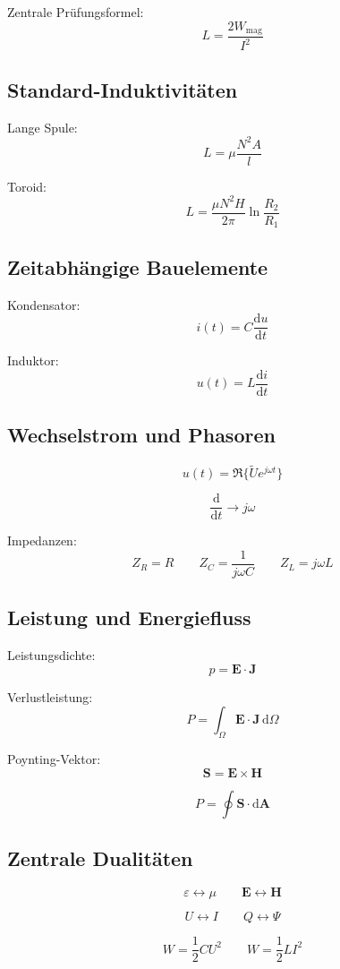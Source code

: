 \documentclass[a4paper]{article}
\begin{document}
Zentrale Prüfungsformel:
\[
\boxed{
L = \frac{2W_\mathrm{mag}}{I^2}
}
\]

\subsection{Standard-Induktivitäten}

Lange Spule:
\[
L = \mu \frac{N^2 A}{l}
\]

Toroid:
\[
L = \frac{\mu N^2 H}{2\pi}
\ln\frac{R_2}{R_1}
\]

\subsection{Zeitabhängige Bauelemente}

Kondensator:
\[
i(t) = C \frac{\mathrm d u}{\mathrm dt}
\]

Induktor:
\[
u(t) = L \frac{\mathrm d i}{\mathrm dt}
\]

\subsection{Wechselstrom und Phasoren}

\[
u(t) = \Re\{\tilde U e^{j\omega t}\}
\]

\[
\frac{\mathrm d}{\mathrm dt} \rightarrow j\omega
\]

Impedanzen:
\[
Z_R = R
\qquad
Z_C = \frac{1}{j\omega C}
\qquad
Z_L = j\omega L
\]

\subsection{Leistung und Energiefluss}

Leistungsdichte:
\[
p = \mathbf{E}\cdot\mathbf{J}
\]

Verlustleistung:
\[
P = \int_\Omega \mathbf{E}\cdot\mathbf{J}\,\mathrm d\Omega
\]

Poynting-Vektor:
\[
\mathbf{S} = \mathbf{E} \times \mathbf{H}
\]

\[
P = \oint \mathbf{S}\cdot \mathrm d\mathbf{A}
\]

\subsection{Zentrale Dualitäten}

\[
\varepsilon \leftrightarrow \mu
\qquad
\mathbf{E} \leftrightarrow \mathbf{H}
\]

\[
U \leftrightarrow I
\qquad
Q \leftrightarrow \Psi
\]

\[
W=\frac12 C U^2
\qquad
W=\frac12 L I^2
\]
\end{document}
